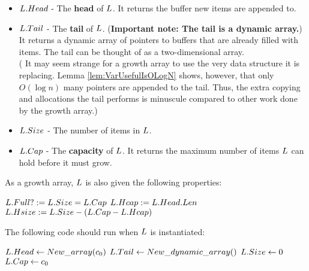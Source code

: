 \begin{itemize}
	\item $L.Head$ - The \textbf{head} of $\VarList$. It returns the buffer new items are appended to.
	\item $L.Tail$ - The \textbf{tail} of $\VarList$. (\textbf{Important note: The tail is a dynamic array.}) It returns a dynamic array of pointers to buffers that are already filled with items. The tail can be thought of as a two-dimensional array.\\
	({\HdrRemark} It may seem strange for a growth array to use the very data structure it is replacing. Lemma \ref{lem:VarUsefulIsOLogN} shows, however, that only $O(\log n)$ many pointers are appended to the tail. Thus, the extra copying and allocations the tail performs is minuscule compared to other work done by the growth array.)
	\item $L.Size$ - The number of items in $\VarList$.
	\item $L.Cap$ - The \textbf{capacity} of $\VarList$. It returns the maximum number of items $\VarList$ can hold before it must grow.
\end{itemize}

As a growth array, $\VarList$ is also given the following properties:

\begin{algorithm}
	\begin{algorithmic}
		\State $L.Full? := L.Size = L.Cap$
		\State
		\State $L.Hcap := L.Head.Len$
		\State
		\State $L.Hsize := L.Size - \left(L.Cap - L.Hcap\right)$
	\end{algorithmic}
\end{algorithm}

The following code should run when $\VarList$ is instantiated:

\begin{algorithm}
	\begin{algorithmic}
		\Procedure{$\FuncConstructor$}{$\VarList$}
			\State $L.Head \gets New\_array(c_0)$
			\State $L.Tail \gets New\_dynamic\_array()$
			\State $L.Size \gets 0$
			\State $L.Cap \gets c_0$
		\EndProcedure
	\end{algorithmic}
\end{algorithm}